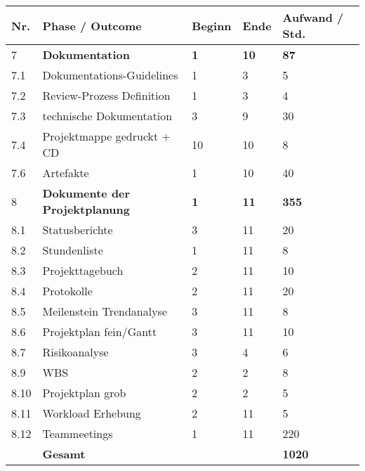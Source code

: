 \begin{tabular}{ | l | p{8cm} | p{2cm}|p{2cm}|p{2cm}|}
\hline
\textbf{Nr.} & \textbf{Phase / Outcome} & \textbf{Beginn}& \textbf{Ende}& \textbf{Aufwand / Std.} \\
\hline
7 &\textbf{Dokumentation}                   &\textbf{1} &\textbf{10} &\textbf{87}  \\
\hline
7.1 &Dokumentations-Guidelines         &1 &3 & 5 \\
\hline
7.2 &Review-Prozess Definition         &1 &3 & 4 \\
\hline
7.3 &technische Dokumentation          &3 &9 & 30 \\
\hline
7.4 &Projektmappe gedruckt + CD        &10 &10 & 8 \\
\hline
7.6 &Artefakte                         &1 &10 & 40 \\
\hline
8 &\textbf{Dokumente der Projektplanung}     &\textbf{1} &\textbf{11} &\textbf{355}  \\
\hline
8.1 & Statusberichte                &3 &11 & 20 \\
\hline
8.2 &Stundenliste                      &1 &11 & 8 \\
\hline
8.3 &Projekttagebuch                   &2 &11 & 10 \\
\hline
8.4 &Protokolle                        &2 &11 & 20 \\
\hline
8.5 &Meilenstein Trendanalyse          &3 &11 & 8 \\
\hline
8.6 &Projektplan fein/Gantt            &3 &11 & 10 \\
\hline
8.7 &Risikoanalyse                     &3 &4 & 6 \\
\hline
8.9 &WBS                               &2 &2 & 8 \\
\hline
8.10 &Projektplan grob                 &2 &2 & 5 \\
\hline
8.11 &Workload Erhebung                &2 &11 & 5 \\
\hline
8.12 &Teammeetings                     &1 &11  & 220 \\
\hline
\hline
& \textbf{Gesamt} & & & \textbf{1020} \\
\hline
\hline
\end{tabular}
